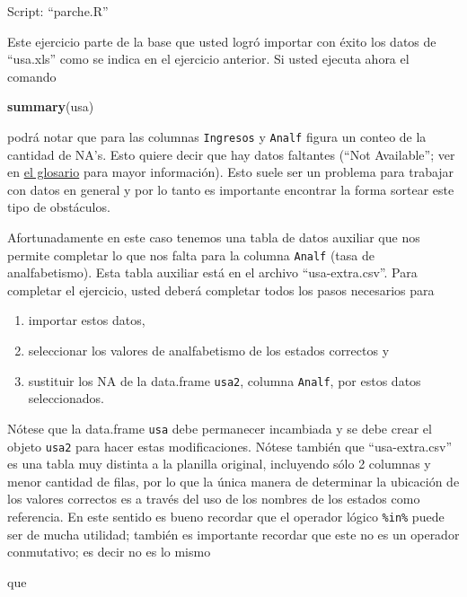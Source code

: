 \documentclass[]{article}
\newenvironment{Shaded}{}{}
\newcommand{\KeywordTok}[1]{\textcolor[rgb]{0.00,0.44,0.13}{\textbf{{#1}}}}
\newcommand{\NormalTok}[1]{{#1}}
\begin{document}
Script: ``parche.R''

Este ejercicio parte de la base que usted logró importar con éxito los
datos de ``usa.xls'' como se indica en el ejercicio anterior. Si usted
ejecuta ahora el comando

\begin{Shaded}
\begin{Highlighting}[]
\KeywordTok{summary}\NormalTok{(usa)}
\end{Highlighting}
\end{Shaded}
podrá notar que para las columnas \texttt{Ingresos} y \texttt{Analf}
figura un conteo de la cantidad de NA's. Esto quiere decir que hay datos
faltantes (``Not Available''; ver en
\href{http://eva.universidad.edu.uy/mod/glossary/showentry.php?courseid=1454\&concept=NA}{el
glosario} para mayor información). Esto suele ser un problema para
trabajar con datos en general y por lo tanto es importante encontrar la
forma sortear este tipo de obstáculos.

Afortunadamente en este caso tenemos una tabla de datos auxiliar que nos
permite completar lo que nos falta para la columna \texttt{Analf} (tasa
de analfabetismo). Esta tabla auxiliar está en el archivo
``usa-extra.csv''. Para completar el ejercicio, usted deberá completar
todos los pasos necesarios para

\begin{enumerate}[1.]
\item
  importar estos datos,
\item
  seleccionar los valores de analfabetismo de los estados correctos y
\item
  sustituir los NA de la data.frame \texttt{usa2}, columna
  \texttt{Analf}, por estos datos seleccionados.
\end{enumerate}
Nótese que la data.frame \texttt{usa} debe permanecer incambiada y se
debe crear el objeto \texttt{usa2} para hacer estas modificaciones.
Nótese también que ``usa-extra.csv'' es una tabla muy distinta a la
planilla original, incluyendo sólo 2 columnas y menor cantidad de filas,
por lo que la única manera de determinar la ubicación de los valores
correctos es a través del uso de los nombres de los estados como
referencia. En este sentido es bueno recordar que el operador lógico
\texttt{\%in\%} puede ser de mucha utilidad; también es importante
recordar que este no es un operador conmutativo; es decir no es lo mismo

\begin{Shaded}
\end{Shaded}
que
\end{document}
